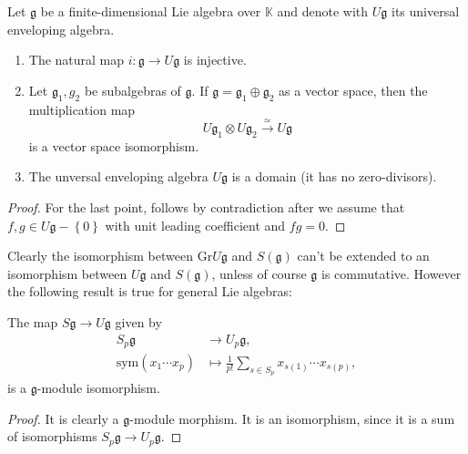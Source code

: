 \documentclass{report}
\begin{document}
\begin{corollary}
    Let $\mathfrak g$ be a finite-dimensional Lie algebra over $\mathbb K$ and denote with $U \mathfrak g$ its universal enveloping algebra.
    \begin{enumerate}[label = (\roman*)]
        \item The natural map $i: \mathfrak g \to U \mathfrak g$ is injective.
        \item Let $\mathfrak g_1, g_2$ be subalgebras of $\mathfrak g$.
        If $\mathfrak g = \mathfrak g_1 \oplus \mathfrak g_2$ as a vector space, then the multiplication map
        \[
        U \mathfrak g_1 \otimes U \mathfrak g_2 \overset{\simeq}{\to} U \mathfrak g
        \]
        is a vector space isomorphism.
        \item The unversal enveloping algebra $U \mathfrak g$ is a domain (it has no zero-divisors).
    \end{enumerate}
\end{corollary}
\begin{proof}
    For the last point, follows by contradiction after we assume that $f, g \in U \mathfrak g - \left\{ 0 \right\}$ with unit leading coefficient and $f g = 0$.
\end{proof}

Clearly the isomorphism between $\mathrm{Gr}U\mathfrak g$ and $S(\mathfrak g)$ can't be extended to an isomorphism between $U \mathfrak g$ and $S(\mathfrak g)$, unless of course $\mathfrak g$ is commutative.
However the following result is true for general Lie algebras:
\begin{proposition}
    The map $S \mathfrak g \to U \mathfrak g$ given by
    \begin{align*}
        S_p \mathfrak g &\to U_p \mathfrak g,\\
        \mathrm{sym}(x_1 \cdots x_p) &\mapsto \frac{1}{p!} \sum_{s \in S_p} x_{s(1)} \cdots x_{s(p)},
    \end{align*}
    is a $\mathfrak g$-module isomorphism.
\end{proposition}
\begin{proof}
    It is clearly a $\mathfrak g$-module morphism.
    It is an isomorphism, since it is a sum of isomorphisms $S_p \mathfrak g \to U_p \mathfrak g$.
\end{proof}
\end{document}
